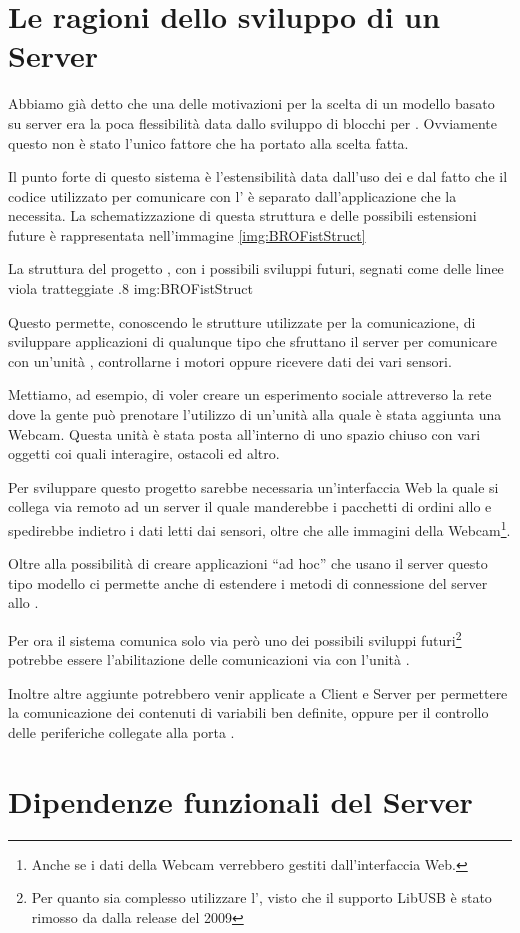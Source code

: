 \section{Le ragioni dello sviluppo di un Server}
Abbiamo già detto che una delle motivazioni per la scelta di un modello
basato su server era la poca flessibilità data dallo sviluppo di blocchi
per . Ovviamente questo non è stato l'unico fattore che ha
portato alla scelta fatta.

Il punto forte di questo sistema è l'estensibilità data dall'uso dei
 e dal fatto che il codice utilizzato per comunicare
con l' è separato dall'applicazione che la necessita. La
schematizzazione di questa struttura e delle possibili estensioni future è
rappresentata nell'immagine \ref{img:BROFistStruct}

        {La struttura del progetto \BROFist{}, con i possibili sviluppi
        futuri, segnati come delle linee viola tratteggiate}
        {.8}
        {img:BROFistStruct}

Questo permette, conoscendo le strutture utilizzate per la comunicazione,
di sviluppare applicazioni di qualunque tipo che sfruttano il server per
comunicare con un'unità \SPAM{}, controllarne i motori oppure ricevere dati
dei vari sensori.

Mettiamo, ad esempio, di voler creare un esperimento sociale attreverso la
rete dove la gente può prenotare l'utilizzo di un'unità \SPAM{} alla quale
è stata aggiunta una Webcam. Questa unità è stata posta all'interno di uno
spazio chiuso con vari oggetti coi quali interagire, ostacoli ed altro.

Per sviluppare questo progetto sarebbe necessaria un'interfaccia Web la
quale si collega via remoto ad un server \BROFist{} il quale manderebbe i
pacchetti di ordini allo \SPAM{} e spedirebbe indietro i dati letti dai
sensori, oltre che alle immagini della Webcam\footnote{Anche se i dati
della Webcam verrebbero gestiti dall'interfaccia Web.}.

Oltre alla possibilità di creare applicazioni ``ad hoc'' che usano il
server \BROFist{} questo tipo modello ci permette anche di estendere i
metodi di connessione del server allo \SPAM{}.

Per ora il sistema comunica solo via  però uno dei
possibili sviluppi futuri\footnote{Per quanto sia complesso utilizzare
l', visto che il supporto LibUSB è stato rimosso da
\nxtOSEK{} dalla release del 2009} potrebbe essere l'abilitazione delle
comunicazioni via  con l'unità .

Inoltre altre aggiunte potrebbero venir applicate a Client e Server per
permettere la comunicazione dei contenuti di variabili ben definite, oppure
per il controllo delle periferiche collegate alla porta .

\section{Dipendenze funzionali del Server}


\cleardoublepage
